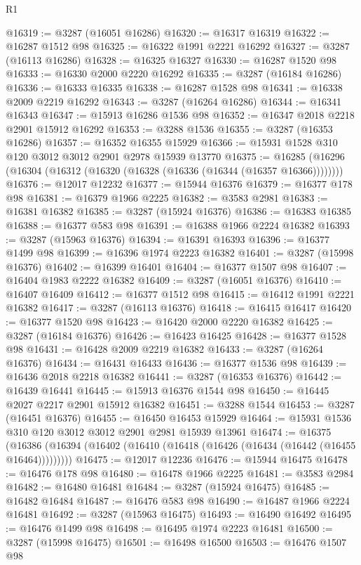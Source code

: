 \begin{lexlean}{R1}
\begin{coremodule}
@16319 := @3287 (@16051 @16286)
@16320 := @16317 @16319
@16322 := @16287 @1512 @98
@16325 := @16322 @1991 @2221 @16292
@16327 := @3287 (@16113 @16286)
@16328 := @16325 @16327
@16330 := @16287 @1520 @98
@16333 := @16330 @2000 @2220 @16292
@16335 := @3287 (@16184 @16286)
@16336 := @16333 @16335
@16338 := @16287 @1528 @98
@16341 := @16338 @2009 @2219 @16292
@16343 := @3287 (@16264 @16286)
@16344 := @16341 @16343
@16347 := @15913 @16286 @1536 @98
@16352 := @16347 @2018 @2218 @2901 @15912 @16292
@16353 := @3288 @1536
@16355 := @3287 (@16353 @16286)
@16357 := @16352 @16355 @15929
@16366 := @15931 @1528 @310 @120 @3012 @3012 @2901 @2978 @15939 @13770
@16375 := @16285 (@16296 (@16304 (@16312 (@16320 (@16328 (@16336 (@16344 (@16357 @16366))))))))
@16376 := @12017 @12232
@16377 := @15944 @16376
@16379 := @16377 @178 @98
@16381 := @16379 @1966 @2225
@16382 := @3583 @2981
@16383 := @16381 @16382
@16385 := @3287 (@15924 @16376)
@16386 := @16383 @16385
@16388 := @16377 @583 @98
@16391 := @16388 @1966 @2224 @16382
@16393 := @3287 (@15963 @16376)
@16394 := @16391 @16393
@16396 := @16377 @1499 @98
@16399 := @16396 @1974 @2223 @16382
@16401 := @3287 (@15998 @16376)
@16402 := @16399 @16401
@16404 := @16377 @1507 @98
@16407 := @16404 @1983 @2222 @16382
@16409 := @3287 (@16051 @16376)
@16410 := @16407 @16409
@16412 := @16377 @1512 @98
@16415 := @16412 @1991 @2221 @16382
@16417 := @3287 (@16113 @16376)
@16418 := @16415 @16417
@16420 := @16377 @1520 @98
@16423 := @16420 @2000 @2220 @16382
@16425 := @3287 (@16184 @16376)
@16426 := @16423 @16425
@16428 := @16377 @1528 @98
@16431 := @16428 @2009 @2219 @16382
@16433 := @3287 (@16264 @16376)
@16434 := @16431 @16433
@16436 := @16377 @1536 @98
@16439 := @16436 @2018 @2218 @16382
@16441 := @3287 (@16353 @16376)
@16442 := @16439 @16441
@16445 := @15913 @16376 @1544 @98
@16450 := @16445 @2027 @2217 @2901 @15912 @16382
@16451 := @3288 @1544
@16453 := @3287 (@16451 @16376)
@16455 := @16450 @16453 @15929
@16464 := @15931 @1536 @310 @120 @3012 @3012 @2901 @2981 @15939 @13961
@16474 := @16375
    (@16386 (@16394 (@16402 (@16410 (@16418 (@16426 (@16434 (@16442 (@16455 @16464)))))))))
@16475 := @12017 @12236
@16476 := @15944 @16475
@16478 := @16476 @178 @98
@16480 := @16478 @1966 @2225
@16481 := @3583 @2984
@16482 := @16480 @16481
@16484 := @3287 (@15924 @16475)
@16485 := @16482 @16484
@16487 := @16476 @583 @98
@16490 := @16487 @1966 @2224 @16481
@16492 := @3287 (@15963 @16475)
@16493 := @16490 @16492
@16495 := @16476 @1499 @98
@16498 := @16495 @1974 @2223 @16481
@16500 := @3287 (@15998 @16475)
@16501 := @16498 @16500
@16503 := @16476 @1507 @98

\end{coremodule}
\end{lexlean}
